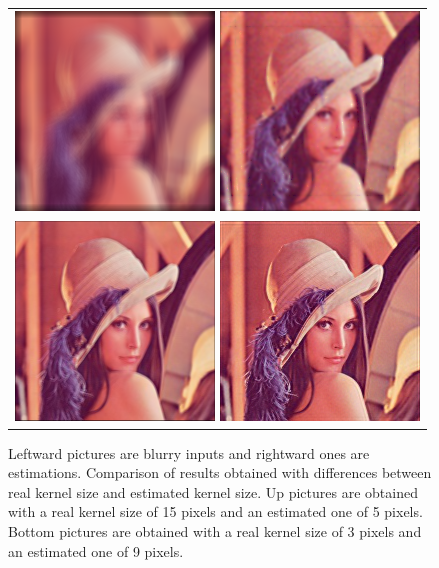 \documentclass{article}
\begin{document}
\begin{figure}
\begin{center}
	\begin{tabular}{c}
		\includegraphics[scale=1]{images/blurred_15_5.png}
		\includegraphics[scale=1]{images/estimation_15_5.png}\\
		\includegraphics[scale=1]{images/blurred_3_9.png}
		\includegraphics[scale=1]{images/estimation_3_9.png}
	\end{tabular}
	\caption{Leftward pictures are blurry inputs and rightward ones are estimations. Comparison of results obtained with differences between real kernel size and estimated kernel size. Up pictures are obtained with a real kernel size of 15 pixels and an estimated one of 5 pixels. Bottom pictures are obtained with a real kernel size of 3 pixels and an estimated one of 9 pixels. }
	\label{kernel_size}
\end{center}
\end{figure}
\end{document}
